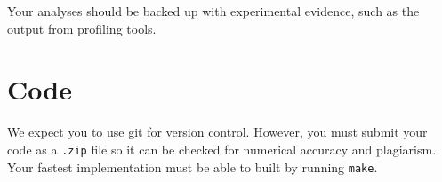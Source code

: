 \documentclass[a4paper,11pt]{article}
\newcommand{\code}[1]{\texttt{#1}}
\begin{document}
Your analyses should be backed up with experimental evidence, such as
the output from profiling tools.




\section{Code}

We expect you to use git for version control.  However, you must
submit your code as a \code{.zip} file so it can be checked for
numerical accuracy and plagiarism.  Your fastest implementation must
be able to built by running \code{make}.
\end{document}
